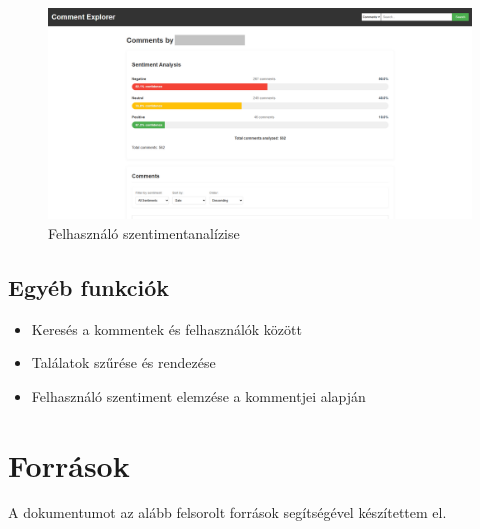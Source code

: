 \documentclass[12pt]{article}
\begin{document}
\begin{figure}[H]
  \centering
  \includegraphics[width=\linewidth]{images/08_comment_user.png}
  \caption{Felhasználó szentimentanalízise}
  \label{fig:08_comment_user}
\end{figure}

\subsection{Egyéb funkciók}

\begin{itemize}
  \item Keresés a kommentek és felhasználók között
  \item Találatok szűrése és rendezése
  \item Felhasználó szentiment elemzése a kommentjei alapján
\end{itemize}

\section{Források}

A dokumentumot az alább felsorolt források segítségével készítettem el.
\end{document}
